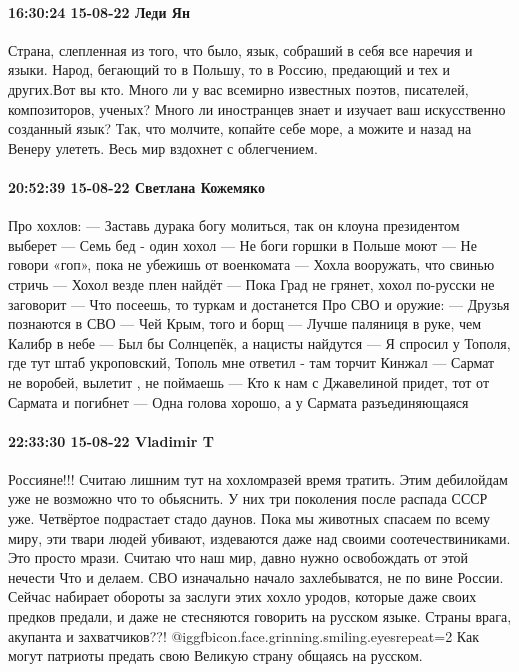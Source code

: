 \paragraph{16:30:24 15-08-22 Леди Ян}

Страна, слепленная из того, что было, язык, собраший в себя все наречия и
языки. Народ, бегающий то в Польшу, то в Россию, предающий и тех и других.Вот
вы кто. Много ли у вас всемирно известных поэтов, писателей, композиторов,
ученых? Много ли иностранцев знает и изучает ваш искусственно созданный язык?
Так, что молчите, копайте себе море, а можите и назад на Венеру улететь. Весь
мир вздохнет с облегчением.

\paragraph{20:52:39 15-08-22 Светлана Кожемяко}

\obeycr
Про хохлов:
— Заставь дурака богу молиться, так он клоуна президентом выберет
— Семь бед - один хохол
— Не боги горшки в Польше моют
— Не говори «гоп», пока не убежишь от военкомата
— Хохла вооружать, что свинью стричь
— Хохол везде плен найдёт
— Пока Град не грянет, хохол по-русски не заговорит
— Что посеешь, то туркам и достанется
Про СВО и оружие:
— Друзья познаются в СВО
— Чей Крым, того и борщ
— Лучше паляниця в руке, чем Калибр в небе
— Был бы Солнцепёк, а нацисты найдутся
— Я спросил у Тополя, где тут штаб укроповский, Тополь мне ответил - там торчит Кинжал
— Сармат не воробей, вылетит , не поймаешь
— Кто к нам с Джавелиной придет, тот от Сармата и погибнет
— Одна голова хорошо, а у Сармата разъединяющаяся
\restorecr

\paragraph{22:33:30 15-08-22 Vladimir T}

\obeycr
Россияне!!!
Считаю лишним тут на хохломразей время тратить. Этим дебилойдам уже не возможно что то обьяснить.
У них три поколения после распада СССР уже. Четвёртое подрастает стадо даунов.
Пока мы животных спасаем по всему миру, эти твари людей убивают, издеваются даже над своими соотечествиниками. Это просто мрази.
Считаю что наш мир, давно нужно освобождать от этой нечести
Что и делаем.
СВО изначально начало захлебыватся, не по вине России.
Сейчас набирает обороты за заслуги этих хохло уродов, которые даже своих предков предали, и даже не стесняются говорить на русском языке. Страны врага, акупанта и захватчиков??!  @igg{fbicon.face.grinning.smiling.eyes}{repeat=2} 
Как могут патриоты предать свою Великую страну общаясь на русском.
\restorecr


